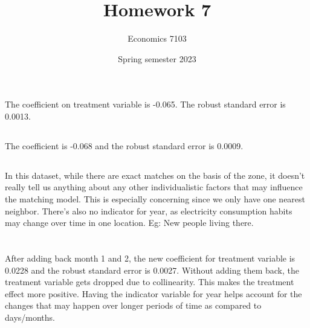 \documentclass{article}
\title{Homework 7}
\author{Economics 7103}
\date{Spring semester 2023}
\begin{document}
\maketitle
\section{}
\subsection{}
The coefficient on treatment variable is -0.065. The robust standard error is 0.0013.

\subsection{}
The coefficient is -0.068 and the robust standard error is 0.0009. 

\subsection{}
In this dataset, while there are exact matches on the basis of the zone, it doesn't really tell us anything about any other individualistic factors that may influence the matching model. This is especially concerning since we only have one nearest neighbor.
\newline
\newline
There's also no indicator for year, as electricity consumption habits may change over time in one location. Eg: New people living there. 

\section{}
\subsection{}
After adding back month 1 and 2, the new coefficient for treatment variable is 0.0228 and the robust standard error is 0.0027. Without adding them back, the treatment variable gets dropped due to collinearity. 
\newline
\newline
This makes the treatment effect more positive. 
Having the indicator variable for year helps account for the changes that may happen over longer periods of time as compared to days/months. 

\section{}
\end{document}
